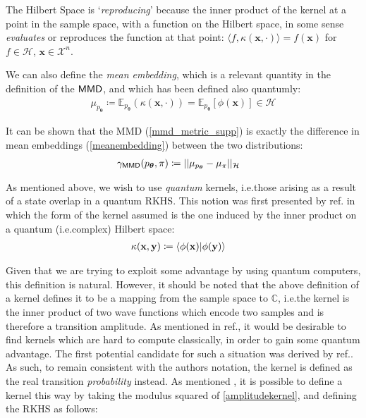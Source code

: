 The Hilbert Space is `\emph{reproducing}' because the inner product of the kernel at a point in the sample space, with a function on the Hilbert space, in some sense \emph{evaluates} or reproduces the function at that point:  $\langle f, \kappa(\mathbf{x}, \cdot)\rangle  = f(\mathbf{x})$ for $f \in \mathcal{H}$, 
$\mathbf{x} \in \mathcal{X}^n$. 

We can also define the \emph{mean embedding}, which is a relevant quantity in the definition of the $\operatorname{\textsf{MMD}}$, and which has been defined also quantumly:
\begin{align}
    \mu_{p_{\boldsymbol\theta}}  \coloneqq \mathbb{E}_{p_{\boldsymbol\theta}}(\kappa(\mathbf{x}, \cdot)) =\mathbb{E}_{p_{\boldsymbol\theta}}[\phi(\mathbf{x})] \in \mathcal{H} \label{meanembedding}
\end{align}

It can be shown that the \textsf{MMD} (\eqref{mmd_metric_supp}) is exactly the difference in mean embeddings (\eqref{meanembedding}) between the two distributions:
\begin{align}
    \gamma_{\operatorname{\textsf{MMD}}}(p_{\boldsymbol\theta}, \pi) &  \coloneqq ||\mu_{p_{\boldsymbol\theta}} - \mu_{\pi}||_{\mathcal{H}}\label{mmd_mean_embedding}
\end{align}

As mentioned above, we wish to use \emph{quantum} kernels, i.e.\@ those arising as a result of a state overlap in a quantum RKHS. This notion was first presented by ref.  in which the form of the kernel assumed is the one induced by the inner product on a quantum (i.e.\@ complex) Hilbert space:
\begin{align}
\kappa(\mathbf{x}, \mathbf{y}) & \coloneqq \braket{\phi(\mathbf{x})|\phi(\mathbf{y})} \label{amplitudekernel}
\end{align}

Given that we are trying to exploit some advantage by using quantum computers, this definition is natural. However, it should be noted that the above definition of a kernel defines it to be a mapping from the sample space to $\mathbb{C}$, i.e.\@ the kernel is the inner product of two wave functions which encode two samples and is therefore a transition amplitude. As mentioned in ref., it would be desirable to find kernels which are hard to compute classically, in order to gain some quantum advantage. The first potential candidate for such a situation was derived by ref.. As such, to remain consistent with the authors notation, the kernel is defined as the real transition \emph{probability} instead. As mentioned , it is possible to define a kernel this way by taking the modulus squared of \eqref{amplitudekernel}, and defining the RKHS as follows:

